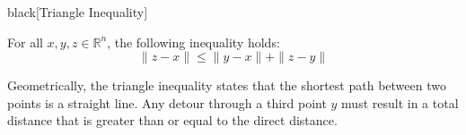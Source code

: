 \begin{math-stroke}
\begin{color-box}{black}[Triangle Inequality]
\setcounter{theorem}{1}
\begin{proposition} \label{prop:triangle_inequality}
For all $x, y, z \in \mathbb{R}^n$, the following inequality holds:
\begin{equation} \label{eq:triangle_xyz}
\|z - x\| \le \|y - x\| + \|z - y\|
\end{equation}
\end{proposition}
\end{color-box}

\begin{center}
\end{center}

\begin{explanation-of-steps}
Geometrically, the triangle inequality states that the shortest path between two points is a straight line. Any detour through a third point $y$ must result in a total distance that is greater than or equal to the direct distance.
\end{explanation-of-steps}
\end{math-stroke}

